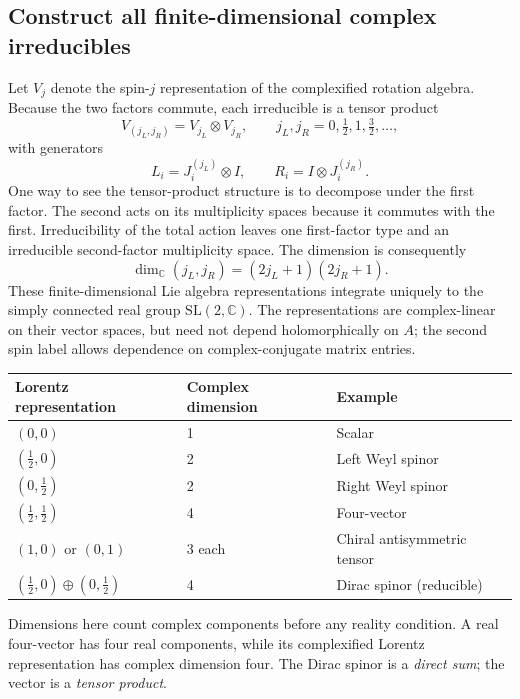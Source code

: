 \documentclass[11pt]{article}
\newcommand{\C}{\mathbb C}
\newcommand{\SL}{\mathrm{SL}}
\begin{document}
\subsection{Construct all finite-dimensional complex irreducibles}
Let \(V_j\) denote the spin-\(j\) representation of the complexified
rotation algebra. Because the two factors commute, each irreducible is
a tensor product
\begin{equation}
 V_{(j_L,j_R)}=V_{j_L}\otimes V_{j_R},\qquad
 j_L,j_R=0,\tfrac12,1,\tfrac32,\ldots,
 \label{eq:irrep}
\end{equation}
with generators
\[
 L_i=J_i^{(j_L)}\otimes I,\qquad
 R_i=I\otimes J_i^{(j_R)}.
\]
One way to see the tensor-product structure is to decompose under the
first factor. The second acts on its multiplicity spaces because it
commutes with the first. Irreducibility of the total action leaves one
first-factor type and an irreducible second-factor multiplicity space.
The dimension is consequently
\begin{equation}
 \boxed{\dim_\C(j_L,j_R)=(2j_L+1)(2j_R+1).}
 \label{eq:dimension}
\end{equation}
These finite-dimensional Lie algebra representations integrate uniquely
to the simply connected real group \(\SL(2,\C)\). The representations
are complex-linear on their vector spaces, but need not depend
holomorphically on \(A\); the second spin label allows dependence on
complex-conjugate matrix entries.

\begin{center}
\begin{tabular}{lll}
\toprule
Lorentz representation & Complex dimension & Example\\
\midrule
\((0,0)\) & 1 & Scalar\\
\((\tfrac12,0)\) & 2 & Left Weyl spinor\\
\((0,\tfrac12)\) & 2 & Right Weyl spinor\\
\((\tfrac12,\tfrac12)\) & 4 & Four-vector\\
\((1,0)\) or \((0,1)\) & 3 each & Chiral antisymmetric tensor\\
\((\tfrac12,0)\oplus(0,\tfrac12)\) & 4 & Dirac spinor (reducible)\\
\bottomrule
\end{tabular}
\end{center}
Dimensions here count complex components before any reality condition.
A real four-vector has four real components, while its complexified
Lorentz representation has complex dimension four. The Dirac spinor is
a \emph{direct sum}; the vector is a \emph{tensor product}.
\end{document}
